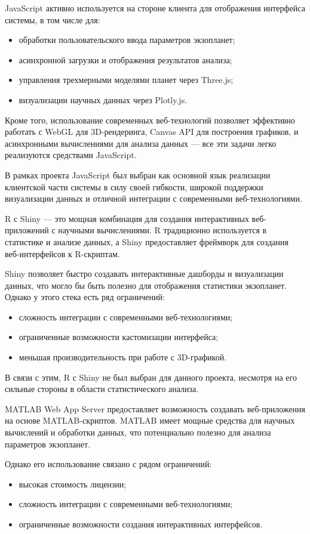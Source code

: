 JavaScript активно используется на стороне клиента для отображения интерфейса системы, в том числе для:
\begin{itemize}
    \item обработки пользовательского ввода параметров экзопланет;
    \item асинхронной загрузки и отображения результатов анализа;
    \item управления трехмерными моделями планет через Three.js;
    \item визуализации научных данных через Plotly.js.
\end{itemize}

Кроме того, использование современных веб-технологий позволяет эффективно работать с WebGL для 3D-рендеринга, Canvas API для построения графиков, и асинхронными вычислениями для анализа данных — все эти задачи легко реализуются средствами JavaScript.

В рамках проекта JavaScript был выбран как основной язык реализации клиентской части системы в силу своей гибкости, широкой поддержки визуализации данных и отличной интеграции с современными веб-технологиями.

R с Shiny — это мощная комбинация для создания интерактивных веб-приложений с научными вычислениями. R традиционно используется в статистике и анализе данных, а Shiny предоставляет фреймворк для создания веб-интерфейсов к R-скриптам.

Shiny позволяет быстро создавать интерактивные дашборды и визуализации данных, что могло бы быть полезно для отображения статистики экзопланет. Однако у этого стека есть ряд ограничений:
\begin{itemize}
    \item сложность интеграции с современными веб-технологиями;
    \item ограниченные возможности кастомизации интерфейса;
    \item меньшая производительность при работе с 3D-графикой.
\end{itemize}

В связи с этим, R с Shiny не был выбран для данного проекта, несмотря на его сильные стороны в области статистического анализа.

MATLAB Web App Server предоставляет возможность создавать веб-приложения на основе MATLAB-скриптов. MATLAB имеет мощные средства для научных вычислений и обработки данных, что потенциально полезно для анализа параметров экзопланет.

Однако его использование связано с рядом ограничений:
\begin{itemize}
    \item высокая стоимость лицензии;
    \item сложность интеграции с современными веб-технологиями;
    \item ограниченные возможности создания интерактивных интерфейсов.
\end{itemize}

